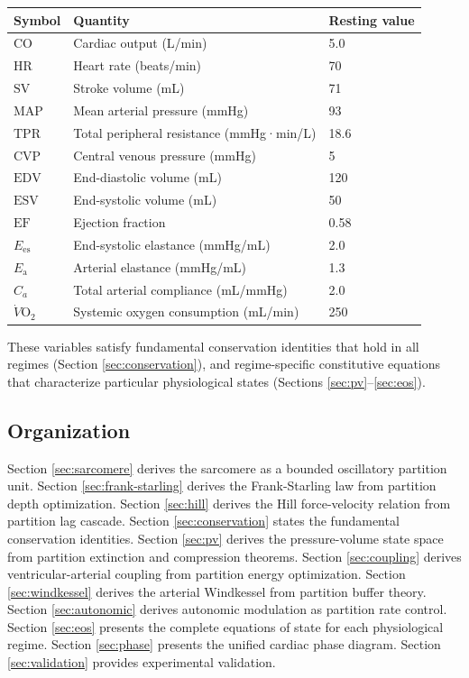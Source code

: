 \documentclass[12pt,a4paper]{article}
\theoremstyle{remark}
\newcommand{\Ees}{E_{\mathrm{es}}}
\newcommand{\Ea}{E_{\mathrm{a}}}
\newcommand{\CO}{\mathrm{CO}}
\newcommand{\SV}{\mathrm{SV}}
\newcommand{\HR}{\mathrm{HR}}
\newcommand{\MAP}{\mathrm{MAP}}
\newcommand{\TPR}{\mathrm{TPR}}
\newcommand{\CVP}{\mathrm{CVP}}
\newcommand{\EDV}{\mathrm{EDV}}
\newcommand{\ESV}{\mathrm{ESV}}
\newcommand{\EF}{\mathrm{EF}}
\begin{document}
\begin{center}
\begin{tabular}{lll}
\toprule
\textbf{Symbol} & \textbf{Quantity} & \textbf{Resting value} \\
\midrule
$\CO$ & Cardiac output (L/min) & 5.0 \\
$\HR$ & Heart rate (beats/min) & 70 \\
$\SV$ & Stroke volume (mL) & 71 \\
$\MAP$ & Mean arterial pressure (mmHg) & 93 \\
$\TPR$ & Total peripheral resistance (mmHg·min/L) & 18.6 \\
$\CVP$ & Central venous pressure (mmHg) & 5 \\
$\EDV$ & End-diastolic volume (mL) & 120 \\
$\ESV$ & End-systolic volume (mL) & 50 \\
$\EF$ & Ejection fraction & 0.58 \\
$\Ees$ & End-systolic elastance (mmHg/mL) & 2.0 \\
$\Ea$ & Arterial elastance (mmHg/mL) & 1.3 \\
$C_a$ & Total arterial compliance (mL/mmHg) & 2.0 \\
$\dot{V}\mathrm{O}_2$ & Systemic oxygen consumption (mL/min) & 250 \\
\bottomrule
\end{tabular}
\end{center}

These variables satisfy fundamental conservation identities that hold in all regimes (Section \ref{sec:conservation}), and regime-specific constitutive equations that characterize particular physiological states (Sections \ref{sec:pv}--\ref{sec:eos}).

\subsection{Organization}

Section \ref{sec:sarcomere} derives the sarcomere as a bounded oscillatory partition unit. Section \ref{sec:frank-starling} derives the Frank-Starling law from partition depth optimization. Section \ref{sec:hill} derives the Hill force-velocity relation from partition lag cascade. Section \ref{sec:conservation} states the fundamental conservation identities. Section \ref{sec:pv} derives the pressure-volume state space from partition extinction and compression theorems. Section \ref{sec:coupling} derives ventricular-arterial coupling from partition energy optimization. Section \ref{sec:windkessel} derives the arterial Windkessel from partition buffer theory. Section \ref{sec:autonomic} derives autonomic modulation as partition rate control. Section \ref{sec:eos} presents the complete equations of state for each physiological regime. Section \ref{sec:phase} presents the unified cardiac phase diagram. Section \ref{sec:validation} provides experimental validation.
\end{document}
